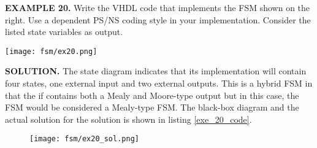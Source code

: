 \begin{leftbar}
\begin{minipage}[t]{0.5\textwidth}
\vspace{10pt}
\noindent
\textbf{EXAMPLE 20.}
Write the VHDL code that implements the FSM shown on the right. Use a dependent PS/NS coding style in your implementation. Consider the listed state variables as output.
\end{minipage}
\begin{minipage}[t]{0.47\textwidth}
\vspace{0pt}\raggedright
\centering
\texttt{[image: fsm/ex20.png]}
\end{minipage}
\end{leftbar}

\noindent
\textbf{SOLUTION.} The state diagram indicates that its implementation will contain four states, one external input and two external outputs. This is a hybrid FSM in that the if contains both a Mealy and Moore-type output but in this case, the FSM would be considered a Mealy-type FSM. The black-box diagram and the actual solution for the solution is shown in listing \ref{exe_20_code}. 
\begin{figure}[!h]
    \centering
	\texttt{[image: fsm/ex20\_sol.png]}
\end{figure}

